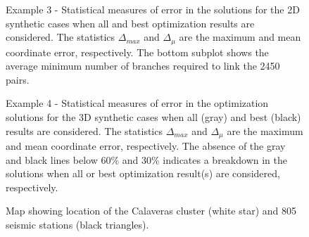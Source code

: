 \documentclass[12pt,double]{article}
\begin{document}

\begin{figure}
\caption{Example 3 - Statistical measures of error in the
 solutions for the 2D synthetic cases when all and best
optimization results are considered. The statistics $\Delta_{max}$
and $\Delta_\mu$  are the maximum and mean coordinate error,
respectively. The bottom subplot shows the average minimum number of
branches required to link the 2450 pairs.}
 \label{fig:optimisationresults-2Dsynth}
\end{figure}


\begin{figure}
\caption{Example 4 - Statistical measures of error in the
optimization solutions for the 3D synthetic cases when all (gray)
and best (black) results are considered. The statistics
$\Delta_{max}$ and $\Delta_\mu$ are the maximum and mean coordinate
error, respectively. The absence of the gray and black lines below
60\% and 30\% indicates a breakdown in the solutions when all or
best optimization result(s) are considered, respectively.}
\label{fig:optimisationresults-3Dsynth}
\end{figure}


\begin{figure}
\caption{Map
showing location of the Calaveras cluster (white star) and 805
seismic stations (black triangles).}
\label{fig:-eqopti-California-Calaveras}
\end{figure}

\end{document}
